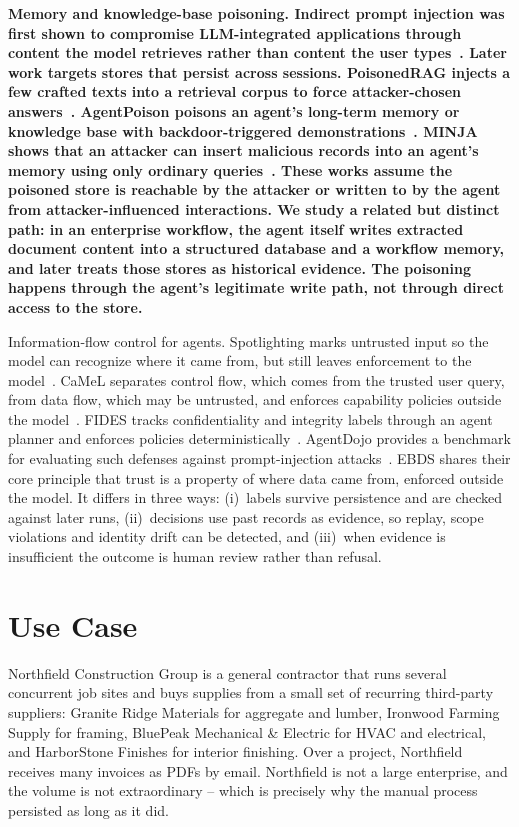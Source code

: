 \documentclass[conference]{IEEEtran}
\newenvironment{added}{\bfseries}{}
\begin{document}
\begin{added}
Memory and knowledge-base poisoning. Indirect prompt injection was first shown to compromise LLM-integrated applications through content the model retrieves rather than content the user types~\cite{greshake2023indirect}. Later work targets stores that persist across sessions. PoisonedRAG injects a few crafted texts into a retrieval corpus to force attacker-chosen answers~\cite{zou2025poisonedrag}. AgentPoison poisons an agent's long-term memory or knowledge base with backdoor-triggered demonstrations~\cite{chen2024agentpoison}. MINJA shows that an attacker can insert malicious records into an agent's memory using only ordinary queries~\cite{dong2025minja}. These works assume the poisoned store is reachable by the attacker or written to by the agent from attacker-influenced interactions. We study a related but distinct path: in an enterprise workflow, the agent itself writes extracted document content into a structured database and a workflow memory, and later treats those stores as historical evidence. The poisoning happens through the agent's legitimate write path, not through direct access to the store.

Information-flow control for agents. Spotlighting marks untrusted input so the model can recognize where it came from, but still leaves enforcement to the model~\cite{hines2024spotlighting}. CaMeL separates control flow, which comes from the trusted user query, from data flow, which may be untrusted, and enforces capability policies outside the model~\cite{debenedetti2025camel}. FIDES tracks confidentiality and integrity labels through an agent planner and enforces policies deterministically~\cite{costa2025fides}. AgentDojo provides a benchmark for evaluating such defenses against prompt-injection attacks~\cite{debenedetti2024agentdojo}. EBDS shares their core principle that trust is a property of where data came from, enforced outside the model. It differs in three ways: (i)~labels survive persistence and are checked against later runs, (ii)~decisions use past records as evidence, so replay, scope violations and identity drift can be detected, and (iii)~when evidence is insufficient the outcome is human review rather than refusal.
\end{added}
  



\section{Use Case}
Northfield Construction Group is a general contractor that runs several concurrent job sites and buys supplies from a small set of recurring third-party suppliers: Granite Ridge Materials for aggregate and lumber, Ironwood Farming Supply for framing, BluePeak Mechanical \& Electric for HVAC and electrical, and HarborStone Finishes for interior finishing. Over a project, Northfield receives many invoices as PDFs by email. Northfield is not a large enterprise, and the volume is not extraordinary – which is precisely why the manual process persisted as long as it did. 
 
\end{document}
